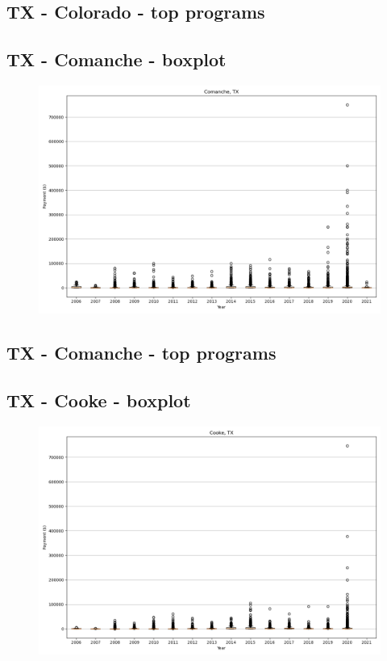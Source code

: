 \subsection*{TX - Colorado - top programs}

\newpage
\subsection*{TX - Comanche - boxplot}
\begin{figure}[h]
\centering
\includegraphics[width=7in]{../output/boxplots/counties/Comanche-TX_boxplot.png}
\end{figure}


\subsection*{TX - Comanche - top programs}

\newpage
\subsection*{TX - Cooke - boxplot}
\begin{figure}[h]
\centering
\includegraphics[width=7in]{../output/boxplots/counties/Cooke-TX_boxplot.png}
\end{figure}



